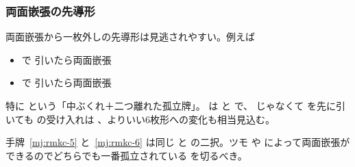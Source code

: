 \documentclass[../nankiru_main.tex]{subfiles}
\begin{document}
%
%
%  
%  

\subsubsection*{両面嵌張の先導形}

両面嵌張から一枚外しの先導形は見逃されやすい。例えば

\begin{itemize}
\item {} で  引いたら両面嵌張
\item {} で  引いたら両面嵌張
\end{itemize}

特に  という「中ぶくれ＋二つ離れた孤立牌」。 は  と  で、 じゃなくて  を先に引いても  の受け入れは 、よりいい6枚形への変化も相当見込む。

手牌~\ref{mj:rmkc-5} と~\ref{mj:rmkc-6} は同じ  と  の二択。ツモ  や  によって両面嵌張ができるのでどちらでも一番孤立されている  を切るべき\citep[][p. 122]{uzaku-haikouritsu}。
\end{document}

